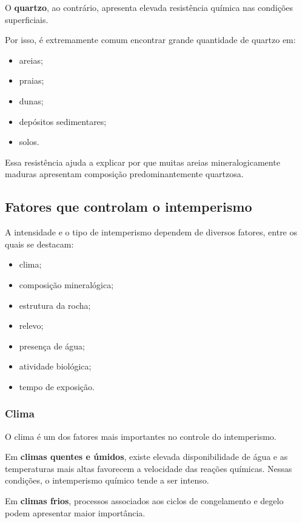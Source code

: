 \documentclass[a4paper,12pt]{article}
\theoremstyle{definition}
\theoremstyle{definition}
\theoremstyle{definition}
\begin{document}
O \textbf{quartzo}, ao contrário, apresenta elevada resistência química nas condições superficiais.

Por isso, é extremamente comum encontrar grande quantidade de quartzo em:

\begin{itemize}
    \item areias;
    \item praias;
    \item dunas;
    \item depósitos sedimentares;
    \item solos.
\end{itemize}

Essa resistência ajuda a explicar por que muitas areias mineralogicamente maduras apresentam composição predominantemente quartzosa.

\subsection{Fatores que controlam o intemperismo}

A intensidade e o tipo de intemperismo dependem de diversos fatores, entre os quais se destacam:

\begin{itemize}
    \item clima;
    \item composição mineralógica;
    \item estrutura da rocha;
    \item relevo;
    \item presença de água;
    \item atividade biológica;
    \item tempo de exposição.
\end{itemize}

\subsubsection{Clima}

O clima é um dos fatores mais importantes no controle do intemperismo.

Em \textbf{climas quentes e úmidos}, existe elevada disponibilidade de água e as temperaturas mais altas favorecem a velocidade das reações químicas. Nessas condições, o intemperismo químico tende a ser intenso.

Em \textbf{climas frios}, processos associados aos ciclos de congelamento e degelo podem apresentar maior importância.
\end{document}
